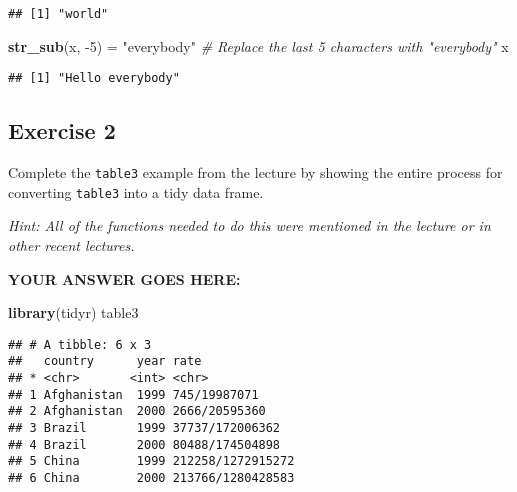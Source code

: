 \documentclass[
]{article}
\newenvironment{Shaded}{\begin{snugshade}}{\end{snugshade}}
\newcommand{\CommentTok}[1]{\textcolor[rgb]{0.56,0.35,0.01}{\textit{#1}}}
\newcommand{\DecValTok}[1]{\textcolor[rgb]{0.00,0.00,0.81}{#1}}
\newcommand{\KeywordTok}[1]{\textcolor[rgb]{0.13,0.29,0.53}{\textbf{#1}}}
\newcommand{\NormalTok}[1]{#1}
\newcommand{\OperatorTok}[1]{\textcolor[rgb]{0.81,0.36,0.00}{\textbf{#1}}}
\newcommand{\StringTok}[1]{\textcolor[rgb]{0.31,0.60,0.02}{#1}}
\begin{document}
\begin{verbatim}
## [1] "world"
\end{verbatim}

\begin{Shaded}
\begin{Highlighting}[]
\KeywordTok{str\_sub}\NormalTok{(x, }\DecValTok{{-}5}\NormalTok{) =}\StringTok{ "everybody"}  \CommentTok{\# Replace the last 5 characters with "everybody"}
\NormalTok{x}
\end{Highlighting}
\end{Shaded}

\begin{verbatim}
## [1] "Hello everybody"
\end{verbatim}

\hypertarget{exercise-2}{%
\subsection{Exercise 2}\label{exercise-2}}

Complete the \texttt{table3} example from the lecture by showing the
entire process for converting \texttt{table3} into a tidy data frame.

\emph{Hint: All of the functions needed to do this were mentioned in the
lecture or in other recent lectures.}

\textbf{YOUR ANSWER GOES HERE:}

\begin{Shaded}
\begin{Highlighting}[]
\KeywordTok{library}\NormalTok{(tidyr)}
\NormalTok{table3}
\end{Highlighting}
\end{Shaded}

\begin{verbatim}
## # A tibble: 6 x 3
##   country      year rate             
## * <chr>       <int> <chr>            
## 1 Afghanistan  1999 745/19987071     
## 2 Afghanistan  2000 2666/20595360    
## 3 Brazil       1999 37737/172006362  
## 4 Brazil       2000 80488/174504898  
## 5 China        1999 212258/1272915272
## 6 China        2000 213766/1280428583
\end{verbatim}

\begin{Shaded}
\end{Shaded}
\end{document}
